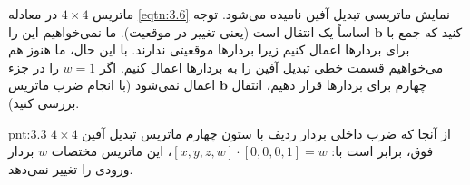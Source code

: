{\begin{spacing}{1.5}
        ماتریس $4\times 4$ در معادله \ref{eqtn:3.6} نمایش ماتریسی تبدیل آفین نامیده می‌شود.
        توجه کنید که جمع با $\textbf{b}$ اساساً یک انتقال است (یعنی تغییر در موقعیت).
        ما نمی‌خواهیم این را برای بردارها اعمال کنیم زیرا بردارها موقعیتی ندارند.
        با این حال، ما هنوز هم می‌خواهیم قسمت خطی تبدیل آفین را به بردارها اعمال کنیم.
        اگر $w=1$ را در جزء چهارم برای بردارها قرار دهیم، انتقال $\textbf{b}$ اعمال نمی‌شود (با انجام ضرب ماتریس بررسی کنید).

        \begin{point}{pnt:3.3}
            \Large
            از آنجا که ضرب داخلی بردار ردیف با ستون چهارم ماتریس تبدیل آفین $4\times 4$ فوق، برابر است با:
            $[x, y, z, w]\cdot[0,0,0,1]=w$، این ماتریس مختصات $w$ بردار ورودی را تغییر نمی‌دهد.
        \end{point}
    \end{spacing}
}

